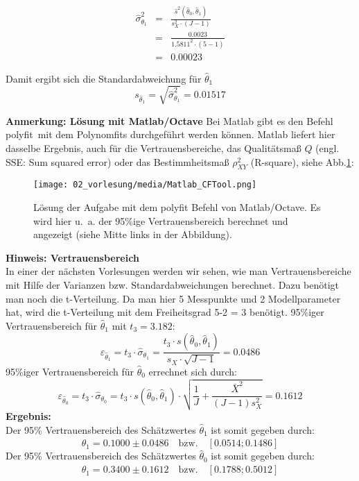 \begin{eqnarray}
\hat\sigma^2_{\theta_1} &=& \frac{ \hat s^2(\hat{\theta}_0 ,\hat{\theta}_1 )}
{s^2_X \cdot (J- 1) }
\nonumber \\
&=& \frac{ 0.0023}
{1.5811^2 \cdot (5- 1) } \nonumber \\
&=& 0.00023
\end{eqnarray}

Damit ergibt sich die Standardabweichung für $\hat\theta_1$
\[
s_{\hat\theta_1} = \sqrt{\hat\sigma_{\theta_1}^2} = 0.01517
\]

\newpage
\textbf{Anmerkung: Lösung mit Matlab/Octave}
Bei Matlab gibt es den Befehl \glqq polyfit\grqq ~mit dem Polynomfits durchgeführt werden können. Matlab liefert hier dasselbe Ergebnis, auch für die Vertrauensbereiche, das Qualitätsmaß $Q$ (engl. SSE: Sum squared error) oder das Bestimmheitsmaß $\rho^2_{XY}$ (R-square), siehe Abb.\ref{fig:MatlabPolyfit}:
\begin{figure}[!htp]
	\begin{center}
		\texttt{[image: 02\_vorlesung/media/Matlab\_CFTool.png]}
		\caption{Lösung der Aufgabe mit dem polyfit Befehl von Matlab/Octave.
			Es wird hier u.~a. der 95\%ige Vertrauensbereich berechnet und
			angezeigt (siehe Mitte links in der Abbildung).}
		\label{fig:MatlabPolyfit}
	\end{center}
\end{figure}

\textbf{Hinweis: Vertrauensbereich} \\
In einer der nächsten Vorlesungen werden wir sehen, wie man Vertrauensbereiche
mit Hilfe der Varianzen bzw. Standardabweichungen berechnet. Dazu benötigt man
noch die t-Verteilung. Da man hier 5 Messpunkte und 2 Modellparameter hat,
wird die t-Verteilung mit dem Freiheitsgrad 5-2 = 3 benötigt.
95\%iger Vertrauensbereich für $\hat\theta_1$ mit $t_3 = 3.182$:
\[
\varepsilon _{\hat{\theta}_1} = t_3 \cdot \hat\sigma_{\theta_1} = \frac{t_3 \cdot s(\hat{\theta}_0 ,
	\hat{\theta}_1 )}{s_X \cdot \sqrt {J
		- 1} } = 0.0486
\]
95\%iger Vertrauensbereich für $\hat\theta_0$ errechnet sich durch:
\[
\varepsilon _{\hat{\theta}_0} = t_3 \cdot \hat\sigma_{\theta_0} = t_3 \cdot s(\hat{\theta}_0 ,\hat{\theta}_1 ) \cdot \sqrt {\frac{1}{J} + \frac{\bar {X}^2}{(J - 1) s_X^2 }} = 0.1612
\]
\textbf{Ergebnis:} \\
Der 95\% Vertrauensbereich des Schätzwertes $\hat\theta_1$ ist somit gegeben durch:
\begin{equation}
\hat\theta_1 = 0.1000 \pm 0.0486 \quad \text{bzw.} \quad [0.0514;0.1486]
\end{equation}
Der 95\% Vertrauensbereich des Schätzwertes $\hat\theta_0$ ist somit gegeben durch:
\begin{equation}
\hat\theta_1 = 0.3400 \pm 0.1612 \quad \text{bzw.} \quad [0.1788;0.5012]
\end{equation}


